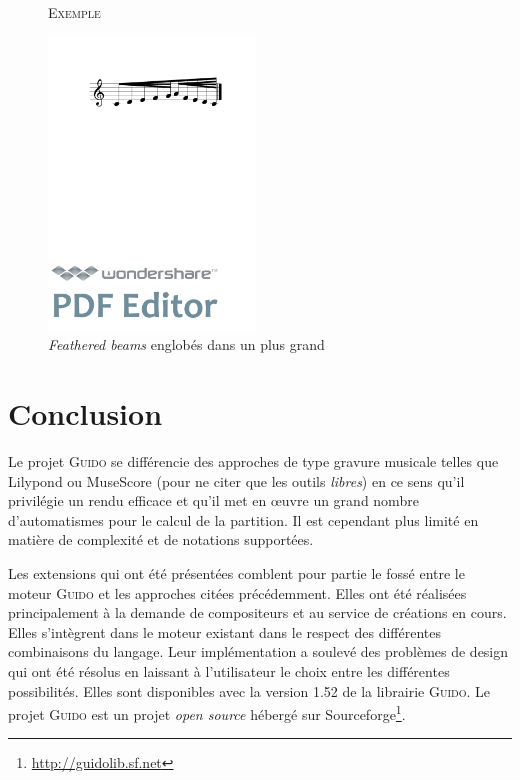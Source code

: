 \documentclass{article}
\newenvironment{gmncode}	{\vspace{-2mm}\small\verbatim}{\endverbatim\vspace{-2mm}}
\newcommand{\guido}			{\textsc{Guido}}
\newcommand{\exemple}		{\vspace{2mm}\hspace*{-3mm}\textsc{Exemple}}
\begin{document}
\begin{figure}[h]
\exemple
\begin{gmncode}
[ 
  \beam( 
    \fBeam(c/8 e d f g/32) 
    \fBeam(a/16 f e d c/64) 
  ) 
]
\end{gmncode}

\begin{center}
\includegraphics[width=55mm]{img/fBeamHierarchie.pdf}
\end{center}
\caption{\emph{Feathered beams} englobés dans un plus grand}
\label{fig:fbeamhierarchie}
\end{figure}



\section{Conclusion}\label{sec:conclusion}
Le projet \guido{} se différencie des approches de type gravure musicale telles que Lilypond ou MuseScore (pour ne citer que les outils \emph{libres}) en ce sens qu'il privilégie un rendu efficace et qu'il met en \oe{}uvre un grand nombre d'automatismes pour le calcul de la partition. Il est cependant plus limité en matière de complexité et de notations supportées. 

Les extensions qui ont été présentées comblent pour partie le fossé entre le moteur \guido{} et les approches citées précédemment. Elles ont été réalisées principalement à la demande de compositeurs et au service de créations en cours. Elles s'intègrent dans le moteur existant dans le respect des différentes combinaisons du langage. Leur implémentation a soulevé des problèmes de design qui ont été résolus en laissant à l'utilisateur le choix entre les différentes possibilités. Elles sont disponibles avec la version 1.52 de la librairie \guido{}. Le projet \guido{} est un projet \emph{open source} hébergé sur Sourceforge\footnote{\url{http://guidolib.sf.net}}.





\end{document}
